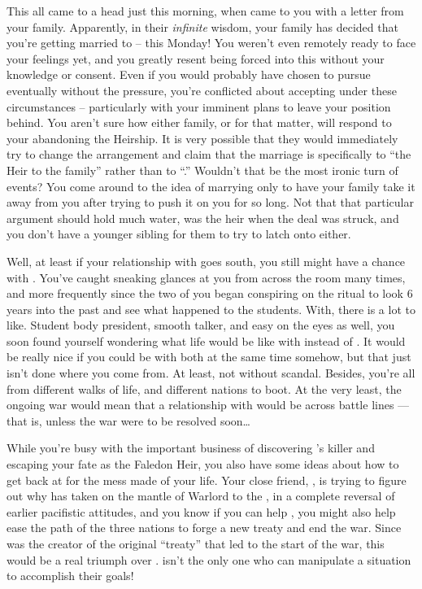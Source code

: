 \documentclass[char]{GL2020}
\begin{document}
This all came to a head just this morning, when \cDiplomat{} came to you with a letter from your family. Apparently, in their \emph{infinite} wisdom, your family has decided that you're getting married to \cChupStudent{} -- this Monday! You weren't even remotely ready to face your feelings yet, and you greatly resent being forced into this without your knowledge or consent. Even if you would probably have chosen to pursue \cChupStudent{} eventually without the pressure, you're conflicted about accepting under these circumstances -- particularly with your imminent plans to leave your position behind. You aren't sure how either family, or \cChupStudent{} for that matter, will respond to your abandoning the Heirship. It is very possible that they would immediately try to change the arrangement and claim that the marriage is specifically to ``the Heir to the \cHeir{\formal} family'' rather than to ``\cHeir{\full}.'' Wouldn't that be the most ironic turn of events? You come around to the idea of marrying \cChupStudent{} only to have your family take it away from you after trying to push it on you for so long. Not that that particular argument should hold much water, \cHeirSibling{} was the heir when the deal was struck, and you don't have a younger sibling for them to try to latch onto either.

Well, at least if your relationship with \cChupStudent{} goes south, you still might have a chance with \cPresident{\full}. You've caught \cPresident{} sneaking glances at you from across the room many times, and more frequently since the two of you began conspiring on the ritual to look 6 years into the past and see what happened to the students. With\cPresident{}, there is a lot to like. Student body president, smooth talker, and easy on the eyes as well, you soon found yourself wondering what life would be like with \cPresident{} instead of \cChupStudent{}. It would be really nice if you could be with both at the same time somehow, but that just isn't done where you come from. At least, not without scandal. Besides, you're all from different walks of life, and different nations to boot. At the very least, the ongoing war would mean that a relationship with \cPresident{} would be across battle lines — that is, unless the war were to be resolved soon\ldots{}

While you're busy with the important business of discovering \cHeirSibling{}'s killer and escaping your fate as the Faledon Heir, you also have some ideas about how to get back at \cDiplomat{} for the mess \cDiplomat{\they} \cDiplomat{\have} made of your life. Your close friend, \cWarlordDaughter{\full}, is trying to figure out why \cWarlordDaughter{\their} \cLoud{\parent} has taken on the mantle of Warlord to the \pShippies{}, in a complete reversal of \cLoud{\their} earlier pacifistic attitudes, and you know if you can help \cWarlordDaughter{}, you might also help ease the path of the three nations to forge a new treaty and end the war. Since \cDiplomat{} was the creator of the original ``treaty'' that led to the start of the war, this would be a real triumph over \cDiplomat{\them}. \cDiplomat{} isn't the only one who can manipulate a situation to accomplish their goals!  
\end{document}
